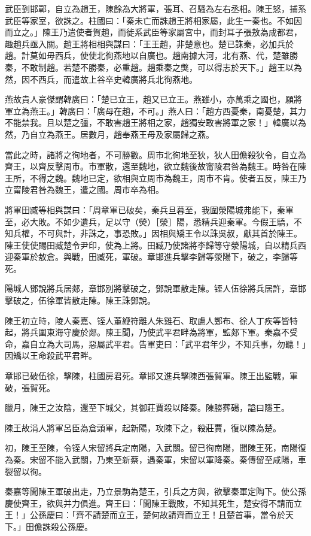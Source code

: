 \begin{pinyinscope}
武臣到邯鄲，自立為趙王，陳餘為大將軍，張耳、召騷為左右丞相。陳王怒，捕系武臣等家室，欲誅之。柱國曰：「秦未亡而誅趙王將相家屬，此生一秦也。不如因而立之。」陳王乃遣使者賀趙，而徙系武臣等家屬宮中，而封耳子張敖為成都君，趣趙兵亟入關。趙王將相相與謀曰：「王王趙，非楚意也。楚已誅秦，必加兵於趙。計莫如毋西兵，使使北徇燕地以自廣也。趙南據大河，北有燕、代，楚雖勝秦，不敢制趙。若楚不勝秦，必重趙。趙乘秦之獘，可以得志於天下。」趙王以為然，因不西兵，而遣故上谷卒史韓廣將兵北徇燕地。

燕故貴人豪傑謂韓廣曰：「楚已立王，趙又已立王。燕雖小，亦萬乘之國也，願將軍立為燕王。」韓廣曰：「廣母在趙，不可。」燕人曰：「趙方西憂秦，南憂楚，其力不能禁我。且以楚之彊，不敢害趙王將相之家，趙獨安敢害將軍之家！」韓廣以為然，乃自立為燕王。居數月，趙奉燕王母及家屬歸之燕。

當此之時，諸將之徇地者，不可勝數。周市北徇地至狄，狄人田儋殺狄令，自立為齊王，以齊反擊周市。市軍散，還至魏地，欲立魏後故甯陵君咎為魏王。時咎在陳王所，不得之魏。魏地已定，欲相與立周市為魏王，周市不肯。使者五反，陳王乃立甯陵君咎為魏王，遣之國。周市卒為相。

將軍田臧等相與謀曰：「周章軍已破矣，秦兵旦暮至，我圍滎陽城弗能下，秦軍至，必大敗。不如少遺兵，足以守（熒）［滎］陽，悉精兵迎秦軍。今假王驕，不知兵權，不可與計，非誅之，事恐敗。」因相與矯王令以誅吳叔，獻其首於陳王。陳王使使賜田臧楚令尹印，使為上將。田臧乃使諸將李歸等守滎陽城，自以精兵西迎秦軍於敖倉。與戰，田臧死，軍破。章邯進兵擊李歸等滎陽下，破之，李歸等死。

陽城人鄧說將兵居郯，章邯別將擊破之，鄧說軍散走陳。铚人伍徐將兵居許，章邯擊破之，伍徐軍皆散走陳。陳王誅鄧說。

陳王初立時，陵人秦嘉、铚人董緶符離人朱雞石、取慮人鄭布、徐人丁疾等皆特起，將兵圍東海守慶於郯。陳王聞，乃使武平君畔為將軍，監郯下軍。秦嘉不受命，嘉自立為大司馬，惡屬武平君。告軍吏曰：「武平君年少，不知兵事，勿聽！」因矯以王命殺武平君畔。

章邯已破伍徐，擊陳，柱國房君死。章邯又進兵擊陳西張賀軍。陳王出監戰，軍破，張賀死。

臘月，陳王之汝陰，還至下城父，其御莊賈殺以降秦。陳勝葬碭，謚曰隱王。

陳王故涓人將軍呂臣為倉頭軍，起新陽，攻陳下之，殺莊賈，復以陳為楚。

初，陳王至陳，令铚人宋留將兵定南陽，入武關。留已徇南陽，聞陳王死，南陽復為秦。宋留不能入武關，乃東至新蔡，遇秦軍，宋留以軍降秦。秦傳留至咸陽，車裂留以徇。

秦嘉等聞陳王軍破出走，乃立景駒為楚王，引兵之方與，欲擊秦軍定陶下。使公孫慶使齊王，欲與并力俱進。齊王曰：「聞陳王戰敗，不知其死生，楚安得不請而立王！」公孫慶曰：「齊不請楚而立王，楚何故請齊而立王！且楚首事，當令於天下。」田儋誅殺公孫慶。


\end{pinyinscope}
